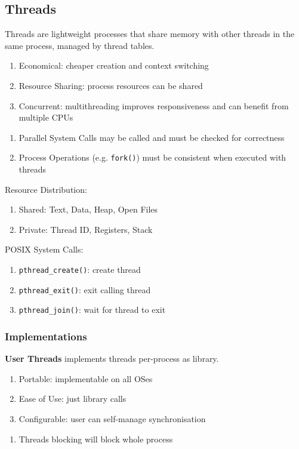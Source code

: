 \documentclass[12pt, a4paper]{article}
\begin{document}
\begin{multicols*}{3}
\subsection{Threads}
Threads are lightweight processes that share memory with other threads in the same process, managed by thread tables.
\begin{enumerate}[$+$]
  \item Economical: cheaper creation and context switching
  \item Resource Sharing: process resources can be shared
  \item Concurrent: multithreading improves responsiveness and can benefit from multiple CPUs
\end{enumerate}\vspace{-1pt}
\begin{enumerate}[$-$]
  \item Parallel System Calls may be called and must be checked for correctness
  \item Process Operations (e.g. \lstinline|fork()|) must be consistent when executed with threads
\end{enumerate}

Resource Distribution:
\begin{enumerate}[\roman*.]
  \item Shared: Text, Data, Heap, Open Files 
  \item Private: Thread ID, Registers, Stack
\end{enumerate}

POSIX System Calls:
\begin{enumerate}[\roman*.]
  \item \lstinline|pthread_create()|: create thread
  \item \lstinline|pthread_exit()|: exit calling thread
  \item \lstinline|pthread_join()|: wait for thread to exit
\end{enumerate}

\subsubsection{Implementations}
\textbf{User Threads} implements threads per-process as library. 
\begin{enumerate}[$+$]
  \item Portable: implementable on all OSes 
  \item Ease of Use: just library calls 
  \item Configurable: user can self-manage synchronisation
\end{enumerate}\vspace{-1pt}
\begin{enumerate}[$-$]
  \item Threads blocking will block whole process
\end{enumerate}


\end{multicols*}
\end{document}
